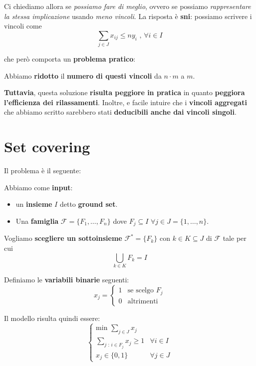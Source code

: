 Ci chiediamo allora se \textit{possiamo fare di meglio}, ovvero
se possiamo \textit{rappresentare la stessa implicazione}
usando \textit{meno vincoli}.
La risposta è \textbf{sni}: possiamo scrivere i vincoli come
\[
    \sum_{j\in J} x_{ij} \le ny_i \text{ , } \forall i \in I
\]

che però comporta un \textbf{problema pratico}:

\begin{remark}[COMPROMESSO]
    Abbiamo \textbf{ridotto} il \textbf{numero di questi vincoli} 
    da $n \cdot m$ a $m$.

    \textbf{Tuttavia}, questa soluzione \textbf{risulta peggiore in pratica}
    in quanto \textbf{peggiora l'efficienza dei rilassamenti}. 
    Inoltre, e facile intuire che i \textbf{vincoli aggregati} che
    abbiamo scritto sarebbero stati \textbf{deducibili anche dai vincoli singoli}.
\end{remark}

\section{Set covering}

Il problema è il seguente:

\begin{exa}
    Abbiamo come \textbf{input}:
    \begin{itemize}
        \item un \textbf{insieme} $I$ detto \textbf{ground set}.
        \item Una \textbf{famiglia} $\mathcal{F} = \{ F_{1}, \ldots , F_n\}$ 
            dove $F_j \subseteq I$ $\forall j \in J = \{1,\ldots ,n\}  $.
    \end{itemize}
    Vogliamo \textbf{scegliere un sottoinsieme} $\mathcal{F}^* = \{F_k\}$ 
    con $k \in K \subseteq J$ di $\mathcal{F}$ tale per cui
    \[
        \bigcup_{k \in K} F_k = I
    \] 
\end{exa}

Definiamo le \textbf{variabili binarie} seguenti:
\[
    x_j = \begin{cases}
        1 & \text{se scelgo } F_j \\ 
        0 & \text{altrimenti}
    \end{cases}
\]

Il modello risulta quindi essere:
\[
    \begin{cases}
        \text{min } \sum_{j \in J} x_j \\ 
        \sum_{j \text{ : } i \in F_j} x_j \ge 1 & \forall i \in I \\ 
        x_j \in \{0,1\} & \forall j \in J  
    \end{cases}
\]


